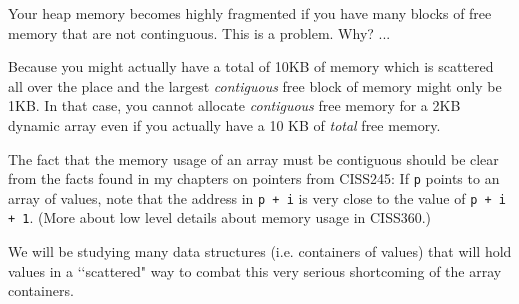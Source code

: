 Your heap memory becomes highly fragmented if you have
many blocks of free memory that are not continguous.
This is a problem.
Why? ...

Because you might actually have a total of 10KB of memory
which is scattered all over the place and the largest
\textit{contiguous} free block of memory might only be
1KB.
In that case, you cannot allocate \textit{contiguous} free
memory for a 2KB dynamic
array even if you actually have a 10 KB of \textit{total} free memory.

The fact that the memory usage of an array must be contiguous
should be clear from the facts found in my chapters on pointers from CISS245:
If \verb!p! points to an array of values,
note that the address in \verb!p + i! is very close to the
value of \verb!p + i + 1!.
(More about low level details about memory usage in CISS360.)

We will be studying many data structures (i.e. containers of values)
that will hold values in a \lq\lq scattered" way to combat this
very serious shortcoming of the array containers.
